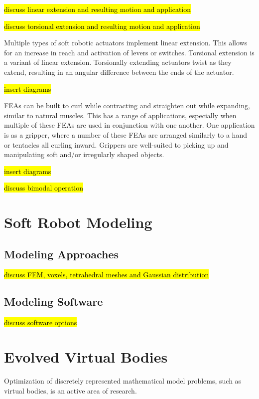 \hl{discuss linear extension and resulting motion and application}

\hl{discuss torsional extension and resulting motion and application}

Multiple types of soft robotic actuators implement linear extension. This allows for an increase in reach and activation of levers or switches. Torsional extension is a variant of linear extension. Torsionally extending actuators twist as they extend, resulting in an angular difference between the ends of the actuator. \cite{Whitesides2018}

\hl{insert diagrams}

FEAs can be built to curl while contracting and straighten out while expanding, similar to natural muscles. This has a range of applications, especially when multiple of these FEAs are used in conjunction with one another. One application is as a gripper, where a number of these FEAs are arranged similarly to a hand or tentacles all curling inward. Grippers are well-suited to picking up and manipulating soft and/or irregularly shaped objects. \cite{Whitesides2018}

\hl{insert diagrams}

\hl{discuss bimodal operation}

\section{Soft Robot Modeling}

\subsection{Modeling Approaches}

\hl{discuss FEM, voxels, tetrahedral meshes and Gaussian distribution}

\subsection{Modeling Software}

\hl{discuss software options}

\section{Evolved Virtual Bodies}

Optimization of discretely represented mathematical model problems, such as virtual bodies, is an active area of research.

